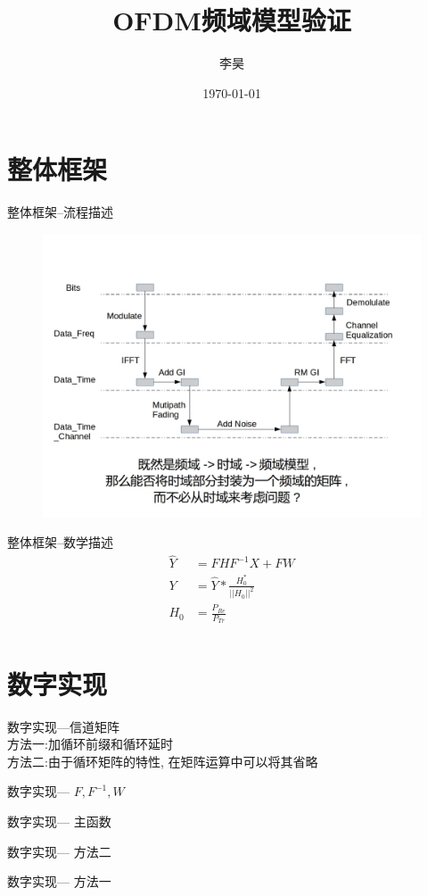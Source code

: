 \documentclass[UTF8]{ctexbeamer}
\title{OFDM频域模型验证}
\date{\today}
\author{李昊}
\institute{通信系统仿真大作业}
\begin{document}
  \maketitle
  \section{整体框架}
  \begin{frame}{整体框架--流程描述}
	\begin{figure}
	  \includegraphics[width=\textwidth]{figure/top.jpg}
	\end{figure}
  \end{frame}
  \begin{frame}{整体框架--数学描述}
	\begin{equation*}
	  \begin{aligned}
	\hat Y &= FHF^{-1}X+FW \\
	 Y &= \hat Y * \frac{H_0^*}{||H_0||^2}\\
	 H_0 &= \frac{P_{Re}}{P_{Tr}} \\
	  \end{aligned}
	\end{equation*}
  \end{frame}

  \section{数字实现}
  \begin{frame}{数字实现---信道矩阵}
	\\方法一:加循环前缀和循环延时
	\scalebox{0.5}{  }
	\\方法二:由于循环矩阵的特性, 在矩阵运算中可以将其省略
	\scalebox{0.5}{  }
  \end{frame}
  \begin{frame}{数字实现--- $F, F^{-1}, W$ }
	
  \end{frame}
  \begin{frame}{数字实现--- 主函数 }
	
  \end{frame}
  \begin{frame}{数字实现--- 方法二 }
	
  \end{frame}
  \begin{frame}{数字实现--- 方法一 }
	
  \end{frame}
\end{document}
